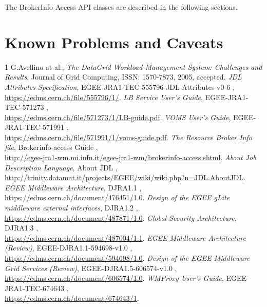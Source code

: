 \documentclass{egee}
\begin{document}
\noindent The BrokerInfo Access API classes are described in the
following sections.
{

\let\ddescription=\description
\let\denddescription=\enddescription
\renewenvironment{description}{\list{}{\labelwidth 4cm\leftmargin 4cm}}{\endlist}




}




\newpage
\section{Known Problems and Caveats}
\label{caveats}



\begin{thebibliography}1
 G.Avellino at al., \emph{The DataGrid Workload Management System: Challenges and Results}, Journal of Grid Computing, ISSN: 1570-7873, 2005, accepted.
\emph{JDL Attributes Specification}, EGEE-JRA1-TEC-555796-JDL-Attributes-v0-6 , \\ \url{https://edms.cern.ch/file/555796/1/}.
\emph{LB Service User's Guide}, EGEE-JRA1-TEC-571273 , \\ \url{https://edms.cern.ch/file/571273/1/LB-guide.pdf}.
\emph{VOMS User's Guide}, EGEE-JRA1-TEC-571991 , \\ \url{https://edms.cern.ch/file/571991/1/voms-guide.pdf}.
\emph{The Resource Broker Info file}, Brokerinfo-access Guide , \\ \url{http://egee-jra1-wm.mi.infn.it/egee-jra1-wm/brokerinfo-access.shtml}.
\emph{About Job Description Language}, About JDL , \\ \url{http://trinity.datamat.it/projects/EGEE/wiki/wiki.php?n=JDL.AboutJDL}.
\emph{EGEE Middleware Architecture}, DJRA1.1 , \\ \url{https://edms.cern.ch/document/476451/1.0}.
\emph{Design of the EGEE gLite middleware external interfaces}, DJRA1.2 , \\ \url{https://edms.cern.ch/document/487871/1.0}.
\emph{Global Security Architecture}, DJRA1.3 , \\ \url{https://edms.cern.ch/document/487004/1.1}.
\emph{EGEE Middleware Architecture (Review)}, EGEE-DJRA1.1-594698-v1.0 , \\ \url{https://edms.cern.ch/document/594698/1.0}.
\emph{Design of the EGEE Middleware Grid Services (Review)}, EGEE-DJRA1.5-606574-v1.0 , \\ \url{https://edms.cern.ch/document/606574/1.0}.
\emph{WMProxy User's Guide}, EGEE-JRA1-TEC-674643 , \\ \url{https://edms.cern.ch/document/674643/1}.
\end{thebibliography}

\clearpage

\end{document}
